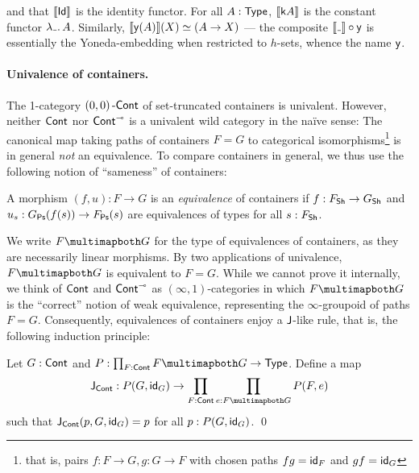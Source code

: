 and that \( \llbracket\mathsf{Id}\rrbracket \) is the identity functor.
For all \( A : \operatorname{\mathsf{Type}} \), \( \llbracket\mathsf{k}{A}\rrbracket \) is the constant functor \( \lambda \Blank.\, A \).
Similarly, \( \llbracket\mathsf{y}(A)\rrbracket(X) \simeq (A \to X) \)
---
the composite \( \Ext{\Blank} \circ \CYo \) is essentially the Yoneda-embedding when restricted to \( h \)-sets, whence the name \( \mathsf{y} \).

\paragraph{Univalence of containers.}
The 1-category \( (0,0)\operatorname{\mathsf{-Cont}} \) of set-truncated containers is univalent.
However, neither \( \operatorname{\mathsf{Cont}} \) nor \( \operatorname{\operatorname{\mathsf{Cont}}}^{{\scriptscriptstyle\multimap}} \) is a univalent wild category in the na{\"i}ve sense:
The canonical map taking paths of containers \( F = G \) to categorical isomorphisms\footnote{%
  that is, pairs \( f : F \to G, g : G \to F \) with chosen paths \( fg = \operatorname{\mathsf{id}}_F \) and \( gf = \operatorname{\mathsf{id}}_G \)
}
is in general \emph{not} an equivalence.
To compare containers in general, we thus use the following notion of \enquote{sameness} of containers:
\begin{definition}
  A morphism \( (f, u) : F \to G \) is an \emph{equivalence} of containers
  if \( f : F_{\operatorname{\mathsf{Sh}}} \to G_{\operatorname{\mathsf{Sh}}} \) and \( u_s : G_{\operatorname{\mathsf{Ps}}}(f(s)) \to F_{\operatorname{\mathsf{Ps}}}(s) \) are equivalences of types for all \( s : F_{\operatorname{\mathsf{Sh}}} \).
\end{definition}
We write \( F \CartEquiv G \) for the type of equivalences of containers, as they are necessarily linear morphisms.
By two applications of univalence, \( F \CartEquiv G \) is equivalent to \( F = G \).
While we cannot prove it internally, we think of \( \operatorname{\mathsf{Cont}} \) and \( \operatorname{\operatorname{\mathsf{Cont}}}^{{\scriptscriptstyle\multimap}} \) as \( (\infty,1) \)-categories
in which \( F \CartEquiv G \) is the \enquote{correct} notion of weak equivalence,
representing the \( \infty \)-groupoid of paths \( F = G \).
Consequently, equivalences of containers enjoy a \( \mathsf{J} \)-like rule, that is, the following induction principle:
\begin{problem}[note={Equivalence induction}]\label{container-J}
  Let \( G : \operatorname{\mathsf{Cont}} \) and \( P : \prod_{F : \Cont} F \CartEquiv G \to \Type \).
  Define a map
  \[
    \Op{J}_{\Cont} : P(G, \id_G) \to \prod_{F : \Cont} \prod_{e : F \CartEquiv G} P(F, e)
  \]
  such that \( \mathsf{J}_{\operatorname{\mathsf{Cont}}}(p, G, \operatorname{\mathsf{id}}_G) = p \) for all \( p : P(G, \operatorname{\mathsf{id}}_G) \).
  \qed
\end{problem}

